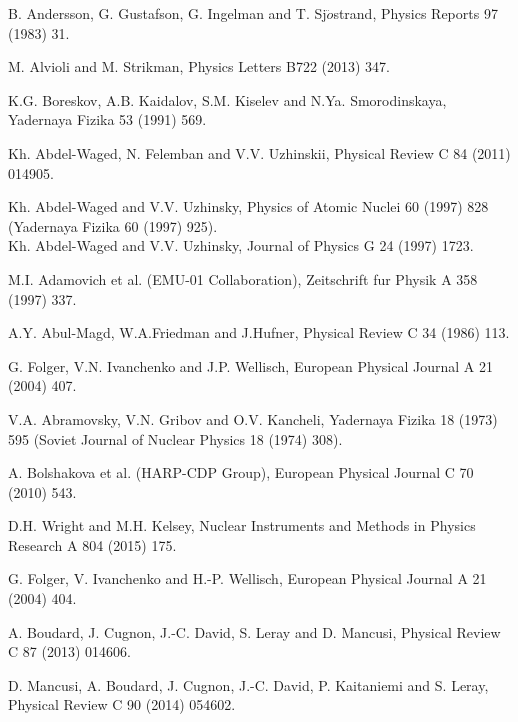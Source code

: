  B. Andersson, G. Gustafson, G. Ingelman and T. Sj$\ddot{o}$strand,
                      Physics Reports 97 (1983) 31.

 M. Alvioli and M. Strikman, Physics Letters B722 (2013) 347.

 K.G. Boreskov, A.B. Kaidalov, S.M. Kiselev and
                       N.Ya. Smorodinskaya, Yadernaya Fizika 53 (1991) 569.

 Kh. Abdel-Waged, N. Felemban and V.V. Uzhinskii,
                       Physical Review C 84 (2011) 014905.

 Kh. Abdel-Waged and V.V. Uzhinsky,
                      Physics of Atomic Nuclei 60 (1997) 828 (Yadernaya Fizika 60 (1997) 925).\\
                      Kh. Abdel-Waged and V.V. Uzhinsky, Journal of Physics G 24 (1997) 1723.

 M.I. Adamovich et al. (EMU-01 Collaboration),
                      Zeitschrift fur Physik A 358 (1997) 337.

 A.Y. Abul-Magd, W.A.Friedman and J.Hufner,
                       Physical Review C 34 (1986) 113.

 G. Folger, V.N. Ivanchenko and J.P. Wellisch,
                       European Physical Journal A 21 (2004) 407.

 V.A. Abramovsky, V.N. Gribov and O.V. Kancheli,
                       Yadernaya Fizika 18 (1973) 595
                       (Soviet Journal of Nuclear Physics 18 (1974) 308).

 A. Bolshakova et al. (HARP-CDP Group),
                       European Physical Journal C 70 (2010) 543.

 D.H. Wright and M.H. Kelsey, Nuclear Instruments and Methods
                      in Physics Research A 804 (2015) 175.

 G. Folger, V. Ivanchenko and H.-P. Wellisch,
                        European Physical Journal A 21 (2004) 404.

 A. Boudard, J. Cugnon, J.-C. David, S. Leray and D. Mancusi,
                      Physical Review C 87 (2013) 014606.

 D. Mancusi, A. Boudard, J. Cugnon, J.-C. David,
                        P. Kaitaniemi and S. Leray,
                        Physical Review C 90 (2014) 054602.

